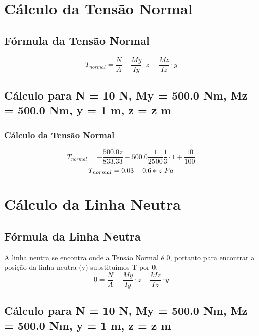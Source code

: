 \documentclass[a4paper,12pt]{article}%
\begin{document}
%
\section{Cálculo da Tensão Normal}%
\label{sec:ClculodaTensoNormal}%
\subsection{Fórmula da Tensão Normal}%
\label{subsec:FrmuladaTensoNormal}%
\begin{dmath*}%
T_{normal} = \frac{N}{A} - \frac{My}{Iy} \cdot z - \frac{Mz}{Iz} \cdot y%
\end{dmath*}

%
\subsection{Cálculo para N = 10 N, My = 500.0 Nm, Mz = 500.0 Nm, y = 1 m, z = z m}%
\label{subsec:ClculoparaN=10N,My=500.0Nm,Mz=500.0Nm,y=1m,z=zm}%
\subsubsection{Cálculo da Tensão Normal}%
\label{ssubsec:ClculodaTensoNormal}%
\begin{dmath*}%
T_{normal} =- \frac{500.0 z}{833.33} - 500.0 \frac{1}{2500} \frac{1}{3} \cdot 1 + \frac{10}{100}%
\end{dmath*}%
\begin{dmath*}%
T_{normal} =0.03 - 0.6*z$ $Pa%
\end{dmath*}

%
\section{Cálculo da Linha Neutra}%
\label{sec:ClculodaLinhaNeutra}%
\subsection{Fórmula da Linha Neutra}%
\label{subsec:FrmuladaLinhaNeutra}%
A linha neutra se encontra onde a Tensão Normal é 0, portanto para encontrar a posição da linha neutra (y) substituímos T por 0.%
\begin{dmath*}%
0 = \frac{N}{A} - \frac{My}{Iy} \cdot z - \frac{Mz}{Iz} \cdot y%
\end{dmath*}

%
\subsection{Cálculo para N = 10 N, My = 500.0 Nm, Mz = 500.0 Nm, y = 1 m, z = z m}%
\label{subsec:ClculoparaN=10N,My=500.0Nm,Mz=500.0Nm,y=1m,z=zm}%
\end{document}
